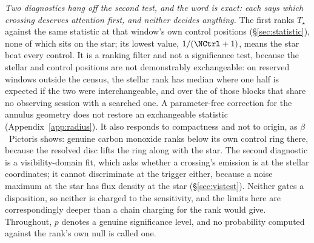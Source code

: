 \emph{Two diagnostics hang off the second test, and the word is exact: each
says which crossing deserves attention first, and neither decides anything.}
The first ranks $T_\star$ against the same statistic at that window's own
\NCtrl{} control positions (\S\ref{sec:statistic}), none of which
sits on the star; its lowest value, $1/(\NCtrl+1)$, means the star beat every
control. It is a ranking filter and not a significance test, because the
stellar and control positions are not demonstrably exchangeable: on
\HoWin{} reserved windows outside the census, the stellar
rank has median \HoRankMed{} where one half is expected if the two were
interchangeable, and \HsIndRankMed{} over the \HsIndBlocks{} of those blocks
that share no observing session with a searched one. A parameter-free
correction for the annulus geometry does not restore an exchangeable
statistic (Appendix~\ref{app:radius}). It
also responds to compactness and not to origin, as $\beta$~Pictoris
shows: genuine carbon monoxide ranks below its own control ring there,
because the resolved disc lifts the ring along with the star. The second
diagnostic is a visibility-domain fit, which asks whether a crossing's
emission is at the stellar coordinates; it
cannot discriminate at the trigger either, because a noise maximum at the
star has flux density at the star (\S\ref{sec:vistest}). Neither gates a
disposition, so neither is charged to the sensitivity, and the limits here
are correspondingly deeper than a chain charging for the rank would give.
Throughout, $p$ denotes a genuine significance level, and no probability
computed against the rank's own null is called one.

